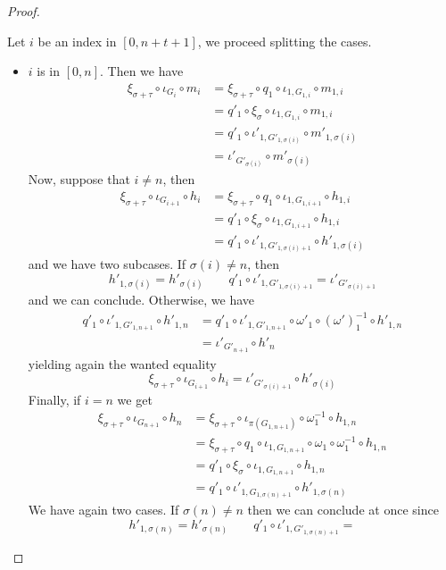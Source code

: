\documentclass[a4paper]{article}
\theoremstyle{definition}
\begin{document}
\begin{proof}
\begin{itemize}
Let $i$ be an index in $[0, n+t+1]$, we proceed splitting the cases.
\begin{itemize}
	\item $i$ is in $[0,n]$. Then we have
	\begin{align*}
		\xi_{\sigma+\tau}\circ \iota_{G_i} \circ m_i &= \xi_{\sigma+\tau} \circ q_1\circ \iota_{1, G_{1,i}}\circ m_{1,i}\\&=q'_1 \circ \xi_\sigma \circ \iota_{1, G_{1,i}}\circ m_{1,i}\\&= q'_1\circ \iota'_{1, G'_{1,\sigma(i)}}\circ m'_{1,\sigma(i)}\\&=\iota'_{G'_{\sigma(i)}}\circ m'_{\sigma(i)}
	\end{align*}
	Now, suppose that $i\neq n$, then 
	\begin{align*}
		\xi_{\sigma+\tau}\circ \iota_{G_{i+1}} \circ h_i &= \xi_{\sigma+\tau} \circ q_1\circ \iota_{1, G_{1,{i+1}}}\circ h_{1,i}\\&=q'_1\circ \xi_\sigma \circ \iota_{1, G_{1,{i+1}}}\circ h_{1,i}\\&= q'_1\circ \iota'_{1, G'_{1,\sigma(i)+1}}\circ h'_{1,\sigma(i)}
	\end{align*}
	and we have two subcases. If $\sigma(i)\neq n$, then \[h'_{1, \sigma(i)}=h'_{\sigma(i)} \qquad q'_1\circ \iota'_{1, G'_{1,\sigma(i)+1}}=
	\iota'_{G'_{\sigma(i)+1}}\] 
	and we can conclude. Otherwise, we have
	\begin{align*}q'_1\circ \iota'_{1, G'_{1,n+1}}\circ h'_{1,n}&=q'_1 \circ \iota'_{1,G'_{1,n+1}} \circ \omega'_1\circ (\omega')^{-1}_1 \circ h'_{1,n}\\&=\iota'_{G'_{n+1}}\circ h'_n
	\end{align*}
	yielding again the wanted equality
	\[\xi_{\sigma+\tau}\circ \iota_{G_{i+1}} \circ h_i=\iota'_{G'_{\sigma(i)+1}}\circ h'_{\sigma(i)}\]
	Finally, if $i=n$ we get
	\begin{align*}
		\xi_{\sigma+\tau}\circ \iota_{G_{n+1}} \circ h_n &= \xi_{\sigma+\tau} \circ \iota_{\pi(G_{1,n+1})} \circ \omega^{-1}_1\circ h_{1,n}\\&= \xi_{\sigma+\tau} \circ q_1\circ \iota_{1, G_{1,n+1}} \circ \omega_1 \circ \omega^{-1}_1 \circ h_{1,n}\\&=q'_1 \circ \xi_\sigma \circ \iota_{1, G_{1,n+1}} \circ h_{1,n}\\&=q'_1\circ \iota'_{1, G_{1,\sigma(n)+1}} \circ h'_{1,\sigma(n)}
	\end{align*}
	We have again two cases. If $\sigma(n)\neq n$ then we can conclude at once since 
	\[h'_{1, \sigma(n)}=h'_{\sigma(n)} \qquad q'_1\circ \iota'_{1, G'_{1,\sigma(n)+1}}=
\]
\end{itemize}
\end{itemize}
\end{proof}
\end{document}
